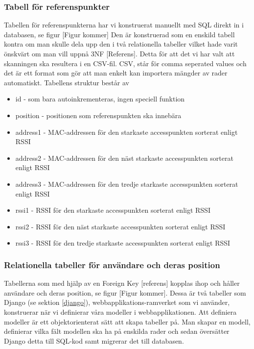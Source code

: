\documentclass[swedish, a4paper,12pt]{article}
\begin{document}
\subsubsection{Tabell för referenspunkter}
Tabellen för referenspunkterna har vi konstruerat manuellt med SQL direkt in i databasen, se figur [Figur kommer] %
Den är konstruerad som en enskild tabell kontra om man skulle dela upp den i två relationella tabeller vilket hade varit önskvärt om man vill uppnå 3NF [Referens].%
Detta för att det vi har valt att skanningen ska resultera i en CSV-fil. CSV, står för comma seperated values och det är ett format som gör att man enkelt kan importera mängder av rader automatiskt.
Tabellens struktur består av

\begin{itemize}
  \item id - som bara autoinkrementeras, ingen speciell funktion
  \item position - positionen som referenspunkten ska innebära
  \item address1 - MAC-addressen för den starkaste accesspunkten sorterat enligt RSSI
  \item address2 - MAC-addressen för den näst starkaste accesspunkten sorterat enligt RSSI
  \item address3 - MAC-addressen för den tredje starkaste accesspunkten sorterat enligt RSSI
  \item rssi1 - RSSI för den starkaste accesspunkten sorterat enligt RSSI
  \item rssi2 - RSSI för den näst starkaste accesspunkten sorterat enligt RSSI
  \item rssi3 - RSSI för den tredje starkaste accesspunkten sorterat enligt RSSI
\end{itemize}

\subsubsection{Relationella tabeller för användare och deras position}
Tabellerna som med hjälp av en Foreign Key [referens]%
kopplas ihop och håller användare och deras position, se figur [Figur kommer].%
Dessa är två tabeller som Django (se sektion \ref{django}), webbapplikations-ramverket som vi använder, konstruerar när vi definierar våra modeller i webbapplikationen. Att definiera modeller är ett objektorienterat sätt att skapa tabeller på. Man skapar en modell, definierar vilka fält modellen ska ha på enskilda rader och sedan översätter Django detta till SQL-kod samt migrerar det till databasen.
\end{document}
